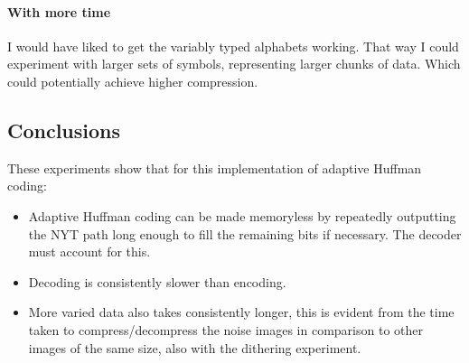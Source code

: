 \documentclass[]{article}
\begin{document}
\paragraph{With more time} I would have liked to get the variably typed alphabets working. That way I could experiment with larger sets of symbols, representing larger chunks of data. Which could potentially achieve higher compression.
\subsection{Conclusions}
These experiments show that for this implementation of adaptive Huffman coding:
\begin{itemize}
	\item Adaptive Huffman coding can be made memoryless by repeatedly outputting the NYT path long enough to fill the remaining bits if necessary. The decoder must account for this.
	\item Decoding is consistently slower than encoding.
	\item More varied data also takes consistently longer, this is evident from the time taken to compress/decompress the noise images in comparison to other images of the same size, also with the dithering experiment.
\end{itemize} 

 
\end{document}
